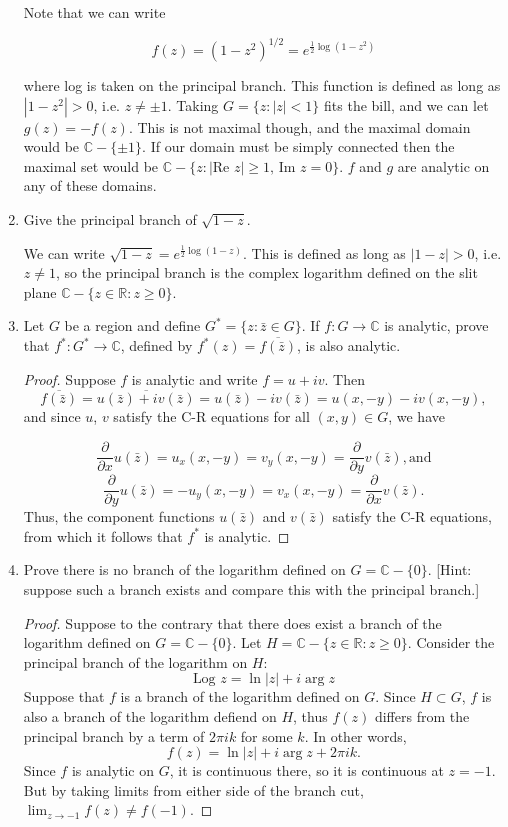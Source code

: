 \documentclass[11pt,oneside,english]{amsart}
\theoremstyle{definition}
\newcommand{\lom}[2]{\lim_{{#1}\rightarrow{#2}}}
\renewcommand{\Re}{\text{Re }}
\renewcommand{\Im}{\text{Im }}
\newcommand{\Log}{\text{Log }}
\newcommand{\pp}[2]{\frac{\partial{#1}}{\partial{#2}}}
\newcommand{\MB}[1]{\mathbb{#1}}
\begin{document}
\begin{enumerate}[leftmargin=*]
Note that we can write

\[
f(z)=(1-z^2)^{1/2}=e^{\frac{1}{2}\log(1-z^2)}
\]

where log is taken on the principal branch. This function is defined as long as $|1-z^2|>0$, i.e. $z\neq \pm1$. Taking $G=\{z:|z|<1\}$ fits the bill, and we can let $g(z)=-f(z)$. This is not maximal though, and the maximal domain would be $\MB{C}-\{\pm 1\}$. If our domain must be simply connected then the maximal set would be $\MB{C}-\{z: |\Re z|\geq1,\,\Im z=0\}$. $f$ and $g$ are analytic on any of these domains.


\item Give the principal branch of $\sqrt{1-z}$.

We can write $\sqrt{1-z}=e^{\frac{1}{2}\log(1-z)}$. This is defined as long as $|1-z|>0$, i.e. $z\neq1$, so the principal branch is the complex logarithm defined on the slit plane $\MB{C}-\{z\in\MB{R}:z\geq 0\}$.

\setcounter{enumi}{18}
\item Let $G$ be a region and define $G^*=\{z:\bar z\in G\}$. If $f:G\to\MB{C}$ is analytic, prove that $f^*:G^*\to \MB{C}$, defined by $f^*(z)=\overline{f(\bar z)}$, is also analytic.

\begin{proof}
Suppose $f$ is analytic and write $f=u+iv$. Then
\[
\overline{f(\bar z)}=\overline{u(\bar z)+iv(\bar z)}=u(\bar z)-iv(\bar z)=u(x,-y)-iv(x,-y),
\]
and since $u$, $v$ satisfy the C-R equations for all $(x,y)\in G$, we have

\[
\pp{}{x}u(\bar z)=u_x(x,-y)=v_y(x,-y)=\pp{}{y}v(\bar z), \text{and}
\]
\[
\pp{}{y}u(\bar z)=-u_y(x,-y)=v_x(x,-y)=\pp{}{x}v(\bar z).
\]
Thus, the component functions $u(\bar z)$ and $v(\bar z)$ satisfy the C-R equations, from which it follows that $f^*$ is analytic.
\end{proof}


\setcounter{enumi}{20}
\item Prove there is no branch of the logarithm defined on $G=\MB{C}-\{0\}$. [Hint: suppose such a branch exists and compare this with the principal branch.]

\begin{proof}
Suppose to the contrary that there does exist a branch of the logarithm defined on $G=\MB{C}-\{0\}$. Let $H=\MB{C}-\{z\in\MB{R}:z\geq 0\}$. Consider the principal branch of the logarithm on $H$:
\[
\Log z=\ln|z|+i\arg z
\]
Suppose that $f$ is a branch of the logarithm defined on $G$. Since $H\subset G$, $f$ is also a branch of the logarithm defiend on $H$, thus $f(z)$ differs from the principal branch by a term of $2\pi i k$ for some $k$. In other words,
\[
f(z)=\ln|z|+i\arg z+2\pi i k.
\]
Since $f$ is analytic on $G$, it is continuous there, so it is continuous at $z=-1$. But by taking limits from either side of the branch cut, $\lom{z}{-1}f(z)\neq f(-1)$.

\end{proof}

\end{enumerate}
\end{document}
